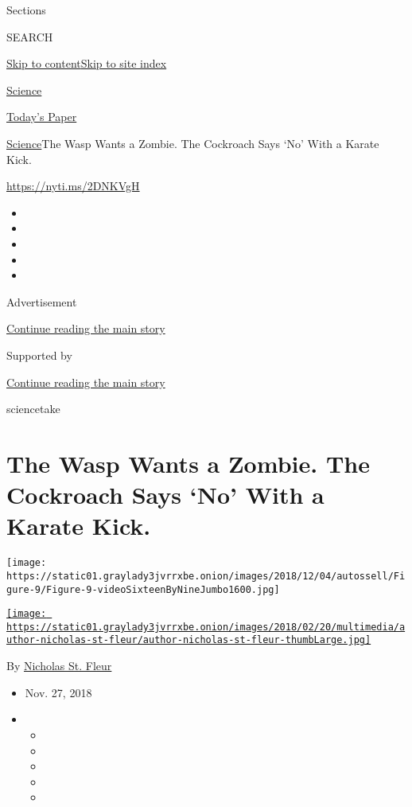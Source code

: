 Sections

SEARCH

\protect\hyperlink{site-content}{Skip to
content}\protect\hyperlink{site-index}{Skip to site index}

\href{https://www.nytimes3xbfgragh.onion/section/science}{Science}

\href{https://myaccount.nytimes3xbfgragh.onion/auth/login?response_type=cookie\&client_id=vi}{}

\href{https://www.nytimes3xbfgragh.onion/section/todayspaper}{Today's
Paper}

\href{/section/science}{Science}\textbar{}The Wasp Wants a Zombie. The
Cockroach Says `No' With a Karate Kick.

\url{https://nyti.ms/2DNKVgH}

\begin{itemize}
\item
\item
\item
\item
\item
\end{itemize}

Advertisement

\protect\hyperlink{after-top}{Continue reading the main story}

Supported by

\protect\hyperlink{after-sponsor}{Continue reading the main story}

sciencetake

\hypertarget{the-wasp-wants-a-zombie-the-cockroach-says-no-with-a-karate-kick}{%
\section{The Wasp Wants a Zombie. The Cockroach Says `No' With a Karate
Kick.}\label{the-wasp-wants-a-zombie-the-cockroach-says-no-with-a-karate-kick}}

\texttt{[image: https://static01.graylady3jvrrxbe.onion/images/2018/12/04/autossell/Figure-9/Figure-9-videoSixteenByNineJumbo1600.jpg]}

\href{https://www.nytimes3xbfgragh.onion/by/nicholas-st-fleur}{\texttt{[image: https://static01.graylady3jvrrxbe.onion/images/2018/02/20/multimedia/author-nicholas-st-fleur/author-nicholas-st-fleur-thumbLarge.jpg]}}

By
\href{https://www.nytimes3xbfgragh.onion/by/nicholas-st-fleur}{Nicholas
St. Fleur}

\begin{itemize}
\item
  Nov. 27, 2018
\item
  \begin{itemize}
  \item
  \item
  \item
  \item
  \item
  \end{itemize}
\end{itemize}


